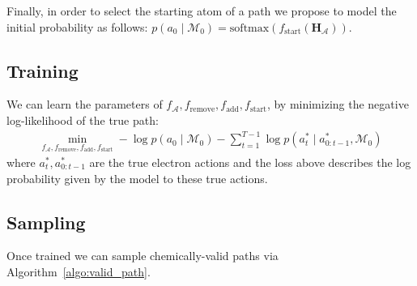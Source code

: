 \documentclass{article}
\newcommand{\Mc}{{\mathcal{M}}}
\newcommand{\Ac}{{\mathcal{A}}}
\newcommand{\Hb}{{\mathbf{H}}}
\begin{document}
Finally, in order to select the starting atom of a path we propose to model the initial probability as follows: $p(a_{0} \mid \Mc_0) = \mbox{softmax}(f_{\textrm{start}}(\Hb_{\Ac}))$.

\subsection{Training}
We can learn the parameters of $f_{\Ac},f_{\textrm{remove}},f_{\textrm{add}},f_{\textrm{start}}$, by minimizing the negative log-likelihood of the true path:
\begin{align}
\min_{f_{\Ac},f_{\textrm{remove}},f_{\textrm{add}},f_{\textrm{start}}} - \log p(a_0 \mid \Mc_0) - \sum_{t=1}^{T-1} \log p(a_t^* \mid a_{0:t-1}^*, \Mc_0) \nonumber
\end{align}
where $a_t^*,a_{0:t-1}^*$ are the true electron actions and the loss above describes the log probability given by the model to these true actions.

\subsection{Sampling}
Once trained we can sample chemically-valid paths via Algorithm~\ref{algo:valid_path}. 
\end{document}

